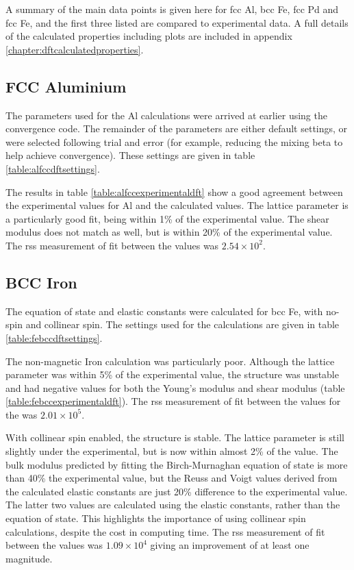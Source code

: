 A summary of the main data points is given here for \acrshort{fcc} Al, \acrshort{bcc} Fe, \acrshort{fcc} Pd and \acrshort{fcc} Fe, and the first three listed are compared to experimental data.  A full details of the calculated properties including plots are included in appendix \ref{chapter:dftcalculatedproperties}.

\subsection{FCC Aluminium}

The parameters used for the Al calculations were arrived at earlier using the convergence code.  The remainder of the parameters are either default settings, or were selected following trial and error (for example, reducing the mixing beta to help achieve convergence).  These settings are given in table \ref{table:alfccdftsettings}.






The results in table \ref{table:alfccexperimentaldft} show a good agreement between the experimental values for Al and the calculated values.  The lattice parameter is a particularly good fit, being within 1\% of the experimental value.  The shear modulus does not match as well, but is within 20\% of the experimental value.  The \acrshort{rss} measurement of fit between the values was $2.54 \times 10^2$.



\FloatBarrier
\subsection{BCC Iron}

The equation of state and elastic constants were calculated for \acrshort{bcc} Fe, with no-spin and collinear spin.  The settings used for the calculations are given in table \ref{table:febccdftsettings}. 


The non-magnetic Iron calculation was particularly poor.  Although the lattice parameter was within 5\% of the experimental value, the structure was unstable and had negative values for both the Young's modulus and shear modulus (table \ref{table:febccexperimentaldft}).  The \acrshort{rss} measurement of fit between the values for the was $2.01 \times 10^5$.

With collinear spin enabled, the structure is stable.  The lattice parameter is still slightly under the experimental, but is now within almost 2\% of the value.  The bulk modulus predicted by fitting the Birch-Murnaghan equation of state is more than 40\% the experimental value, but the Reuss and Voigt values derived from the calculated elastic constants are just 20\% difference to the experimental value.  The latter two values are calculated using the elastic constants, rather than the equation of state.  This highlights the importance of using collinear spin calculations, despite the cost in computing time.  The \acrshort{rss} measurement of fit between the values was $1.09 \times 10^4$ giving an improvement of at least one magnitude.




